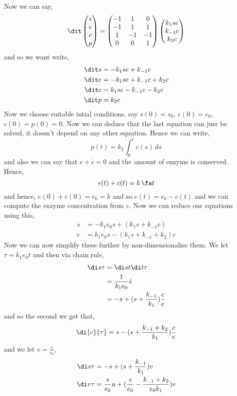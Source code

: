 Now we can say,
$$ \dit \begin{pmatrix}
  s \\ e \\ c \\ p
\end{pmatrix} = \begin{pmatrix}
  -1 & 1 & 0\\
  -1 & 1 & 1 \\
  1 & -1 & -1\\
  0 & 0 & 1
\end{pmatrix} \begin{pmatrix}
  k_1se \\ k_{-1}c \\ k_2c
\end{pmatrix} $$
and so we want write,
\begin{align*}
  \dit s &= -k_1se + k_{-1}c \\
  \dit e &= -k_1se + k_{-1}c + k_2c \\
  \dit c &= k_1se - k_{-1}c - k_2c \\
  \dit p &= k_2c
\end{align*}
Now we choose suitable intial conditions, say $s(0) = s_0$, $e(0) = e_0$, $c(0) = p(0) = 0$. Now we can deduce that the last equation can jusr be solved, it doesn't depend on any other equation. Hence we can write,
$$ p(t) = k_2\int_0^t c(s)\,ds $$
and also we can say that $\dot e + \dot c = 0$ and the amount of enzyme is conserved. Hence,
$$ e(t) + c(t) = k\,\fa t  $$
and hence, $e(0) + c(0) = e_0 = k$ and so $e(t) = e_0 - c(t)$ and we can compute the enzyme concentration from $c$. Now we can reduce our equations using this,
\begin{align*}
  \dot s &= -k_1e_0s + (k_1s + k_{-1}c) \\
  \dot c &= k_1e_0s - (k_1s + k_{-1} + k_2)c
\end{align*}
Now we can now simplify these further by non-dimensionalise them. We let $\tau = k_1e_0t$ and then via chain rule,
\begin{align*}
  \di s \tau &= \di s t \di t \tau \\
  &= \frac{1}{k_1e_0}\dot s \\
  &= -s + (s + \frac{k_{-1}}{k_1})\frac{c}{e}
\end{align*}
and so the second we get that,
$$ \di{c}{\tau} = s - (s + \frac{k_{-1} + k_2}{k_1})\frac{c}{e} $$
and we let $v = \frac{c}{e_0}$,
\begin{align*}
  \di s \tau &= -s + (s + \frac{k_{-1}}{k_1})v \\
  \di v \tau &= \frac{s}{e_0}u + (\frac{s}{e_0} - \frac{k_{-1} + k_2}{e_0k_1})v
\end{align*}
